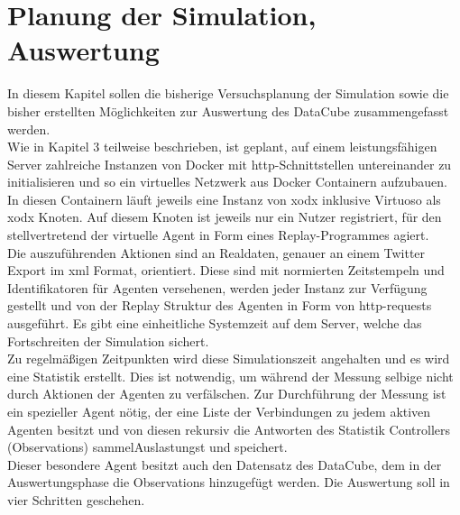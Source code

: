\documentclass{article}
\begin{document}
\section{Planung der Simulation, Auswertung}

In diesem Kapitel sollen die bisherige Versuchsplanung der Simulation sowie die bisher erstellten Möglichkeiten zur Auswertung des DataCube zusammengefasst werden.\\
Wie in Kapitel 3 teilweise beschrieben, ist geplant, auf einem leistungsfähigen Server zahlreiche Instanzen von Docker mit http-Schnittstellen untereinander zu initialisieren und so ein virtuelles Netzwerk aus Docker Containern aufzubauen. In diesen Containern läuft jeweils eine Instanz von xodx inklusive Virtuoso als xodx Knoten. Auf diesem Knoten ist jeweils nur ein Nutzer registriert, für den stellvertretend der virtuelle Agent in Form eines Replay-Programmes agiert.\\
Die auszuführenden Aktionen sind an Realdaten, genauer an einem Twitter Export im xml Format, orientiert. Diese sind mit normierten Zeitstempeln und Identifikatoren für Agenten versehenen, werden jeder Instanz zur Verfügung gestellt und von der Replay Struktur des Agenten in Form von http-requests ausgeführt. Es gibt eine einheitliche Systemzeit auf dem Server, welche das Fortschreiten der Simulation sichert.\\
Zu regelmäßigen Zeitpunkten wird diese Simulationszeit angehalten und es wird eine Statistik erstellt. Dies ist notwendig, um während der Messung selbige nicht durch Aktionen der Agenten zu verfälschen. Zur Durchführung der Messung ist ein spezieller Agent nötig, der eine Liste der Verbindungen zu jedem aktiven Agenten besitzt und von diesen rekursiv die Antworten des Statistik Controllers (Observations) sammelAuslastungst und speichert.\\
Dieser besondere Agent besitzt auch den Datensatz des DataCube, dem in der Auswertungsphase die Observations hinzugefügt werden. Die Auswertung soll in vier Schritten geschehen.
\end{document}

